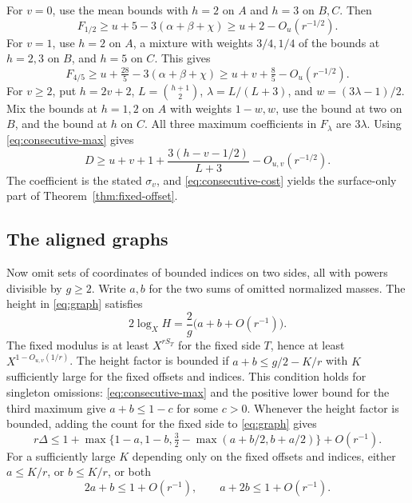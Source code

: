 \documentclass[11pt,reqno]{amsart}
\begin{document}
For \(v=0\), use the mean bounds with \(h=2\) on \(A\)
and \(h=3\) on \(B,C\). Then
\[
 F_{1/2}\ge u+5-3(\alpha+\beta+\chi)
          \ge u+2-O_u(r^{-1/2}).
\]
For \(v=1\), use \(h=2\) on \(A\), a mixture with weights
\(3/4,1/4\) of the bounds at \(h=2,3\) on \(B\), and \(h=5\)
on \(C\). This gives
\[
 F_{4/5}\ge u+\tfrac{28}{5}-3(\alpha+\beta+\chi)
          \ge u+v+\tfrac85-O_u(r^{-1/2}).
\]
For \(v\ge2\), put \(h=2v+2\), \(L=\binom{h+1}{2}\),
\(\lambda=L/(L+3)\), and \(w=(3\lambda-1)/2\).
Mix the bounds at \(h=1,2\) on \(A\) with weights \(1-w,w\),
use the bound at two on \(B\), and the bound at \(h\) on \(C\).
All three maximum coefficients in \(F_\lambda\) are \(3\lambda\).
Using \eqref{eq:consecutive-max} gives
\[
 D\ge u+v+1+\frac{3(h-v-1/2)}{L+3}-O_{u,v}(r^{-1/2}).
\]
The coefficient is the stated \(\sigma_v\), and
\eqref{eq:consecutive-cost} yields the surface-only part of
Theorem~\ref{thm:fixed-offset}.

\subsection{The aligned graphs}
Now omit sets of coordinates of bounded indices on two sides,
all with powers divisible by \(g\ge2\). Write \(a,b\) for the two
sums of omitted normalized masses. The height in \eqref{eq:graph}
satisfies
\[
          2\log_X H=\frac2g\bigl(a+b+O(r^{-1})\bigr).
\]
The fixed modulus is at least \(X^{rS_T}\) for the fixed side \(T\),
hence at least \(X^{1-O_{u,v}(1/r)}\). The height factor is bounded
if \(a+b\le g/2-K/r\) with \(K\) sufficiently large for the fixed
offsets and indices. This condition holds for singleton omissions:
\eqref{eq:consecutive-max} and the positive lower bound for the
third maximum give \(a+b\le1-c\) for some \(c>0\).
Whenever the height factor is bounded, adding the count for
the fixed side to \eqref{eq:graph} gives
\[
 r\Delta\le 1+\max\{1-a,1-b,\tfrac32-\max(a+b/2,b+a/2)\}
              +O(r^{-1}).
\]
For a sufficiently large \(K\) depending only on the fixed offsets
and indices, either
\(a\le K/r\), or \(b\le K/r\), or both
\begin{equation}\label{eq:consecutive-pair}
               2a+b\le1+O(r^{-1}),\qquad a+2b\le1+O(r^{-1}).
\end{equation}
\end{document}
